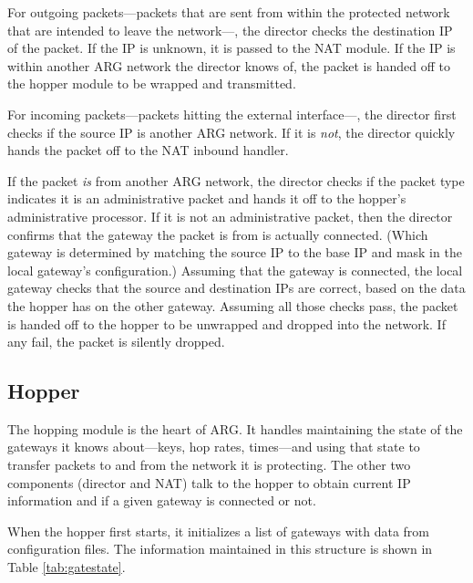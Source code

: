 \par For outgoing packets---packets that are sent from within the protected network that are intended to leave the network---, the director checks the destination \ac{IP} of the packet. If the IP is unknown, it is passed to the \ac{NAT} module. If the IP is within another \ac{ARG} network the director knows of, the packet is handed off to the hopper module to be wrapped and transmitted.

\par For incoming packets---packets hitting the external interface---, the director first checks if the source IP is another ARG network. If it is \textit{not}, the director quickly hands the packet off to the NAT inbound handler.

\par If the packet \textit{is} from another ARG network, the director checks if the packet type indicates it is an administrative packet and hands it off to the hopper's administrative processor. If it is not an administrative packet, then the director confirms that the gateway the packet is from is actually connected. (Which gateway is determined by matching the source \ac{IP} to the base \ac{IP} and mask in the local gateway's configuration.) Assuming that the gateway is connected, the local gateway checks that the source and destination \acp{IP} are correct, based on the data the hopper has on the other gateway. Assuming all those checks pass, the packet is handed off to the hopper to be unwrapped and dropped into the network. If any fail, the packet is silently dropped.

\subsection{Hopper}
\label{sec:arg_hopper}
\par The hopping module is the heart of ARG. It handles maintaining the state of the gateways it knows about---keys, hop rates, times---and using that state to transfer packets to and from the network it is protecting. The other two components (director and \ac{NAT}) talk to the hopper to obtain current IP information and if a given gateway is connected or not. 

\par When the hopper first starts, it initializes a list of gateways with data from configuration files. The information maintained in this structure is shown in Table \ref{tab:gatestate}. 

